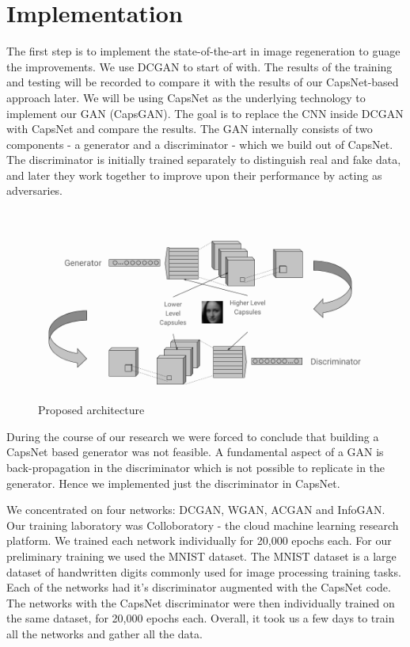 \chapter{Implementation}\label{ch:implementation}


The first step is to implement the state-of-the-art in image regeneration to guage the improvements. We use DCGAN to start of with. The results of the training and testing will be recorded to compare it with the results of our CapsNet-based approach later. We will be using CapsNet as the underlying technology to implement our GAN (CapsGAN). The goal is to replace the CNN inside DCGAN with CapsNet and compare the results. The GAN internally consists of two components - a generator and a discriminator - which we build out of CapsNet. The discriminator is initially trained separately to distinguish real and fake data, and later they work together to improve upon their performance by acting as adversaries.
\par\bigskip

\begin{figure}[H]
\centering\includegraphics[width=1\textwidth]{images/methodology.png}
\caption{Proposed architecture}
\label{fig:capsgan}
\end{figure}

During the course of our research we were forced to conclude that building a CapsNet based generator was not feasible. A fundamental aspect of a GAN is back-propagation in the discriminator which is not possible to replicate in the generator. Hence we implemented just the discriminator in CapsNet. 
\par\bigskip

We concentrated on four networks: DCGAN, WGAN, ACGAN and InfoGAN. Our training laboratory was Colloboratory - the cloud machine learning research platform. We trained each network individually for 20,000 epochs each. For our preliminary training we used the MNIST dataset. The MNIST dataset is a large dataset of handwritten digits commonly used for image processing training tasks. Each of the networks had it's discriminator augmented with the CapsNet code. The networks with the CapsNet discriminator were then individually trained on the same dataset, for 20,000 epochs each. Overall, it took us a few days to train all the networks and gather all the data.
\par\bigskip

